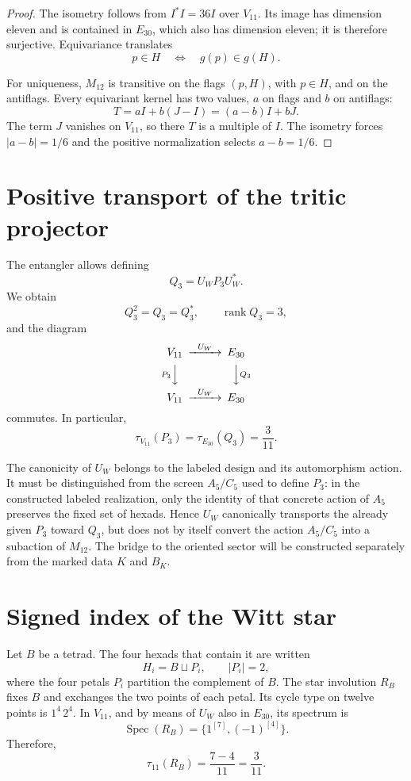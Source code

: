\begin{proof}
The isometry follows from \(I^*I=36I\) over \(V_{11}\). Its image has
dimension eleven and is contained in \(E_{30}\), which also has dimension eleven;
it is therefore surjective. Equivariance translates
\[
 p\in H\quad\Longleftrightarrow\quad g(p)\in g(H).
\]

For uniqueness, \(M_{12}\) is transitive on the flags
\((p,H)\), with \(p\in H\), and on the antiflags. Every equivariant kernel
has two values, \(a\) on flags and \(b\) on
antiflags:
\[
 T=aI+b(J-I)=(a-b)I+bJ.
\]
The term \(J\) vanishes on \(V_{11}\), so there \(T\) is a
multiple of \(I\). The isometry forces \(|a-b|=1/6\) and the positive
normalization selects \(a-b=1/6\).
\end{proof}

\section{Positive transport of the tritic projector}

The entangler allows defining
\[
 \boxed{Q_3=U_WP_3U_W^*.}
\]
We obtain
\[
 Q_3^2=Q_3=Q_3^*,
 \qquad
 \operatorname{rank}Q_3=3,
\]
and the diagram
\[
\begin{CD}
V_{11} @>{U_W}>> E_{30}\\
@V{P_3}VV @VV{Q_3}V\\
V_{11} @>{U_W}>> E_{30}
\end{CD}
\]
commutes. In particular,
\[
 \boxed{\tau_{V_{11}}(P_3)=\tau_{E_{30}}(Q_3)=\frac3{11}.}
\]

The canonicity of \(U_W\) belongs to the labeled design and its
automorphism action. It must be distinguished from the screen \(A_5/C_5\) used to
define \(P_3\): in the constructed labeled realization, only the identity
of that concrete action of \(A_5\) preserves the fixed set of hexads. Hence
\(U_W\) canonically transports the already given \(P_3\) toward
\(Q_3\), but does not by itself convert the action \(A_5/C_5\) into a
subaction of \(M_{12}\). The bridge to the oriented sector will be constructed separately
from the marked data \(K\) and \(B_K\).

\section{Signed index of the Witt star}

Let \(B\) be a tetrad. The four hexads that contain it are written
\[
 H_i=B\sqcup P_i,\qquad |P_i|=2,
\]
where the four petals \(P_i\) partition the complement of \(B\).
The star involution \(R_B\) fixes \(B\) and exchanges the two points
of each petal. Its cycle type on twelve points is \(1^4\,2^4\). In
\(V_{11}\), and by means of \(U_W\) also in \(E_{30}\), its spectrum is
\[
 \operatorname{Spec}(R_B)=\{1^{[7]},(-1)^{[4]}\}.
\]
Therefore,
\[
 \boxed{\tau_{11}(R_B)=\frac{7-4}{11}=\frac3{11}.}
\]

